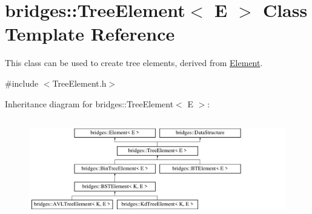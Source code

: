 \hypertarget{classbridges_1_1_tree_element}{}\section{bridges\+:\+:Tree\+Element$<$ E $>$ Class Template Reference}
\label{classbridges_1_1_tree_element}


This class can be used to create tree elements, derived from \mbox{\hyperlink{classbridges_1_1_element}{Element}}.  




{\ttfamily \#include $<$Tree\+Element.\+h$>$}

Inheritance diagram for bridges\+:\+:Tree\+Element$<$ E $>$\+:\begin{figure}[H]
\begin{center}
\leavevmode
\includegraphics[height=4.402516cm]{classbridges_1_1_tree_element}
\end{center}
\end{figure}

